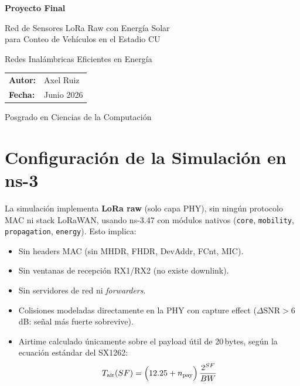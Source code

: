 \documentclass[12pt,letterpaper]{article}
\begin{document}
\begin{titlepage}
  \centering\vspace*{2cm}
  {\LARGE\bfseries Proyecto Final\par}\vspace{0.4cm}
  {\Large Red de Sensores LoRa Raw con Energía Solar\\
   para Conteo de Vehículos en el Estadio CU\par}\vspace{0.8cm}
  {\large Redes Inalámbricas Eficientes en Energía\par}\vspace{2cm}
  \begin{tabular}{ll}
    \textbf{Autor:}  & Axel Ruiz \\[4pt]
    \textbf{Fecha:}  & Junio 2026 \\
  \end{tabular}
  \vfill
  {\small Posgrado en Ciencias de la Computación\par}
\end{titlepage}

\tableofcontents\newpage

\section{Configuración de la Simulación en ns-3}

La simulación implementa \textbf{LoRa raw} (solo capa PHY), sin ningún
protocolo MAC ni stack LoRaWAN, usando ns-3.47 con módulos nativos
(\texttt{core}, \texttt{mobility}, \texttt{propagation}, \texttt{energy}).
Esto implica:
\begin{itemize}
  \item Sin headers MAC (sin MHDR, FHDR, DevAddr, FCnt, MIC).
  \item Sin ventanas de recepción RX1/RX2 (no existe downlink).
  \item Sin servidores de red ni \emph{forwarders}.
  \item Colisiones modeladas directamente en la PHY con capture effect
        ($\Delta\text{SNR} > 6$\,dB: señal más fuerte sobrevive).
  \item Airtime calculado únicamente sobre el payload útil de 20\,bytes,
        según la ecuación estándar del SX1262:
        \[
          T_\text{air}(SF) =
          \Bigl(12.25 + n_\text{pay}\Bigr)\,\frac{2^{SF}}{BW}
        \]
\end{itemize}
\end{document}

